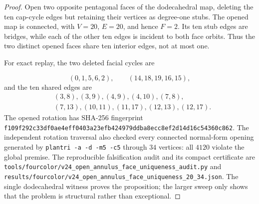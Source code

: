 \begin{proof}
Open two opposite pentagonal faces of the dodecahedral map, deleting the ten
cap-cycle edges but retaining their vertices as degree-one stubs.  The opened
map is connected, with $V=20$, $E=20$, and hence $F=2$.  Its ten stub
edges are bridges, while each of the other ten edges is incident to both face
orbits.  Thus the two distinct opened faces share ten interior edges, not at
most one.

For exact replay, the two deleted facial cycles are

\[
 (0,1,5,6,2),\qquad (14,18,19,16,15),
\]
and the ten shared edges are
\[
\begin{split}
 &(3,8),(3,9),(4,9),(4,10),(7,8),\\
 &(7,13),(10,11),(11,17),(12,13),(12,17).
\end{split}
\]
The opened rotation has SHA-256 fingerprint
\texttt{f109f292c33df0ae4eff0403a23efb424979ddba8ecc8ef2d14d16c54360c862}.
The independent rotation traversal also checked every connected normal-form
opening generated by \texttt{plantri -a -d -m5 -c5} through $34$ vertices:
all $4120$ violate the global premise.  The reproducible falsification
audit and its compact certificate are
\texttt{tools/fourcolor/v24\_open\_annulus\_face\_uniqueness\_audit.py} and
\texttt{results/fourcolor/v24\_open\_annulus\_face\_uniqueness\_20\_34.json}.
The single dodecahedral witness proves the proposition; the larger sweep only
shows that the problem is structural rather than exceptional.
\end{proof}

